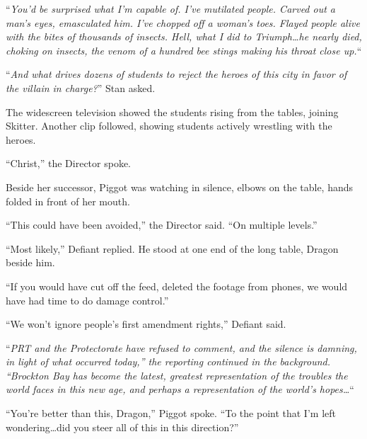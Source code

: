 \blacksquare



``\emph{You'd be surprised what I'm capable of.  I've mutilated people.  Carved out a man's eyes, emasculated him.  I've chopped off a woman's toes.  Flayed people alive with the bites of thousands of insects.  Hell, what I did to Triumph\ldots he nearly died, choking on insects, the venom of a hundred bee stings making his throat close up.}``



``\emph{And what drives dozens of students to reject the heroes of this city in favor of the villain in charge?}''  Stan asked.



The widescreen television showed the students rising from the tables, joining Skitter.  Another clip followed, showing students actively wrestling with the heroes.



``Christ,'' the Director spoke.



Beside her successor, Piggot was watching in silence, elbows on the table, hands folded in front of her mouth.



``This could have been avoided,'' the Director said.  ``On multiple levels.''



``Most likely,'' Defiant replied.  He stood at one end of the long table, Dragon beside him.



``If you would have cut off the feed, deleted the footage from phones, we would have had time to do damage control.''



``We won't ignore people's first amendment rights,'' Defiant said.



``\emph{\ldotsThe PRT and the Protectorate have refused to comment, and the silence is damning, in light of what occurred today,'' the reporting continued in the background.  ``Brockton Bay has become the latest, greatest representation of the troubles the world faces in this new age, and perhaps a representation of the world's hopes\ldots}``



``You're better than this, Dragon,'' Piggot spoke.  ``To the point that I'm left wondering\ldots did you steer all of this in this direction?''



